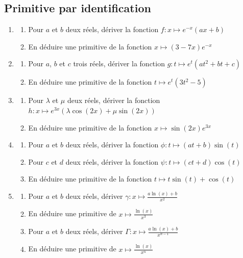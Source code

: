 \documentclass[oneside,12pt]{book}          %
\begin{document}
\subsection{Primitive par identification}
\begin{enumerate}
	\item\begin{enumerate}
		\item Pour $a$ et $b$ deux réels, dériver la fonction $f:x\mapsto e^{-x}(ax+b)$
		\item En déduire une primitive de la fonction $x\mapsto(3-7x)e^{-x}$\\
	\end{enumerate}
	
	\item\begin{enumerate}
		\item Pour $a$, $b$ et $c$ trois réels, dériver la fonction $g:t\mapsto e^t\left(at^2+bt+c\right)$
		\item En déduire une primitive de la fonction $t\mapsto e^t\left(3t^2-5\right)$\\
	\end{enumerate}
	
	\item\begin{enumerate}
		\item Pour $\lambda$ et $\mu$ deux réels, dériver la fonction $h:x\mapsto e^{3x}\left(\lambda\cos(2x)+\mu\sin(2x)\right)$
		\item En déduire une primitive de la fonction $x\mapsto \sin(2x)e^{3x}$\\
	\end{enumerate}
	
	\item\begin{enumerate}
		\item Pour $a$ et $b$ deux réels, dériver la fonction $\phi:t\mapsto(at+b)\sin(t)$
		\item Pour $c$ et $d$ deux réels, dériver la fonction $\psi:t\mapsto(ct+d)\cos(t)$
		\item En déduire une primitive de la fonction $t\mapsto t\sin(t)+\cos(t)$\\
	\end{enumerate}
	
	\item\begin{enumerate}
		\item Pour $a$ et $b$ deux réels, dériver $\gamma:x\mapsto \frac{a\ln(x)+b}{x^2}$
		\item En déduire une primitive de $x\mapsto\frac{\ln(x)}{x^3}$
		\item Pour $a$ et $b$ deux réels, dériver $\Gamma:x\mapsto \frac{a\ln(x)+b}{x^{n-1}}$
		\item En déduire une primitive de $x\mapsto\frac{\ln(x)}{x^n}$
	\end{enumerate}
\end{enumerate}
\end{document}
